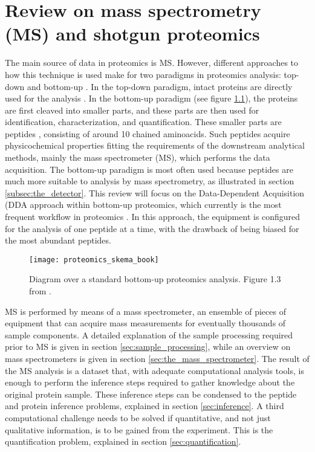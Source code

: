 \chapter{Review on mass spectrometry (\ac{MS}) and shotgun proteomics}
\label{chap:mass_spec}


The main source of data in proteomics is \ac{MS}. However, different approaches to how this technique is used make for two paradigms in proteomics analysis: top-down and bottom-up \cite{Joshi2016}. In the top-down paradigm, intact proteins are directly used for the analysis \cite{Sinitcyn2018}. In the bottom-up paradigm (see figure \ref{fig:proteomics_overview}), the proteins are first cleaved into smaller parts, and these parts are then used for identification, characterization, and quantification. These smaller parts are peptides \cite{Barsnes2008}, consisting of around 10 chained aminoacids. Such peptides acquire physicochemical properties fitting the requirements of the downstream analytical methods, mainly the mass spectrometer (MS), which performs the data acquisition. The bottom-up paradigm is most often used because peptides are much more suitable to analysis by mass spectrometry, as illustrated in section \ref{subsec:the_detector}. This review will focus on the Data-Dependent Acquisition (\ac{DDA} approach within bottom-up proteomics, which currently is the most frequent workflow in proteomics \cite{Sinitcyn2018}. In this approach, the equipment is configured for the analysis of one peptide at a time, with the drawback of being biased for the most abundant peptides.

\begin{figure}[!h]
\texttt{[image: proteomics\_skema\_book]}
\caption[Bottom-up proteomics analysis]{Diagram over a standard bottom-up proteomics analysis. Figure 1.3 from \cite{Barsnes2008}.}
\label{fig:proteomics_overview}
\end{figure}

MS is performed by means of a mass spectrometer, an ensemble of pieces of equipment that can acquire mass measurements for eventually thousands of sample components. A detailed explanation of the sample processing required prior to MS is given in section \ref{sec:sample_processing}, while an overview on mass spectrometers is given in section \ref{sec:the_mass_spectrometer}. The result of the MS analysis is a dataset that, with adequate computational analysis tools, is enough to perform the inference steps required to gather knowledge about the original protein sample. These inference steps can be condensed to the peptide and protein inference problems, explained in section \ref{sec:inference}. A third computational challenge needs to be solved if quantitative, and not just qualitative information, is to be gained from the experiment. This is the quantification problem, explained in section \ref{sec:quantification}.

